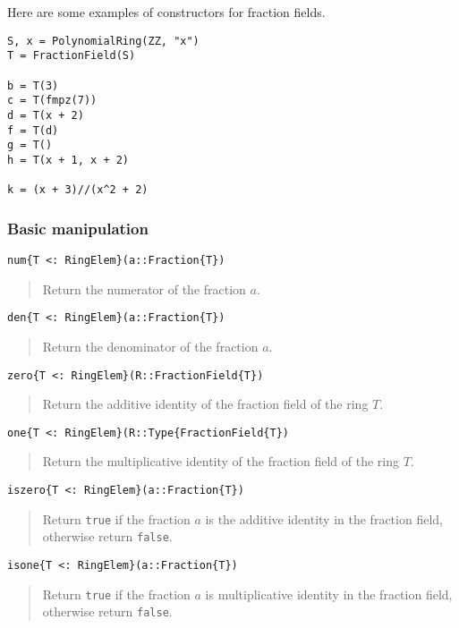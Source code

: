 \documentclass[a4paper,10pt]{article}
\newcommand{\code}{\lstinline}
\newcommand{\desc}[1]{\vspace{-3mm}\begin{quote}#1\end{quote}}
\begin{document}
Here are some examples of constructors for fraction fields.

\begin{lstlisting}
S, x = PolynomialRing(ZZ, "x")
T = FractionField(S)

b = T(3)
c = T(fmpz(7))
d = T(x + 2)
f = T(d)
g = T()
h = T(x + 1, x + 2)

k = (x + 3)//(x^2 + 2)
\end{lstlisting}

\subsubsection{Basic manipulation}

\begin{lstlisting}
num{T <: RingElem}(a::Fraction{T})
\end{lstlisting}

\desc{Return the numerator of the fraction $a$.}

\begin{lstlisting}
den{T <: RingElem}(a::Fraction{T})
\end{lstlisting}

\desc{Return the denominator of the fraction $a$.}

\begin{lstlisting}
zero{T <: RingElem}(R::FractionField{T})
\end{lstlisting}

\desc{Return the additive identity of the fraction field of the ring $T$.}

\begin{lstlisting}
one{T <: RingElem}(R::Type{FractionField{T})
\end{lstlisting}

\desc{Return the multiplicative identity of the fraction field of the ring 
$T$.}

\begin{lstlisting}
iszero{T <: RingElem}(a::Fraction{T})
\end{lstlisting}

\desc{Return \code{true} if the fraction $a$ is the additive identity in the
fraction field, otherwise return \code{false}.}

\begin{lstlisting}
isone{T <: RingElem}(a::Fraction{T})
\end{lstlisting}

\desc{Return \code{true} if the fraction $a$ is multiplicative identity in the
fraction field, otherwise return \code{false}.}
\end{document}
